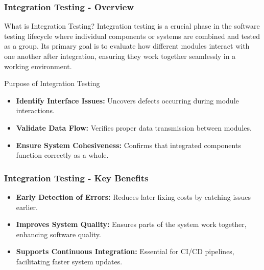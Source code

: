 \documentclass{beamer}
\begin{document}
\begin{frame}[fragile]
    \frametitle{Integration Testing - Overview}
    \begin{block}{What is Integration Testing?}
        Integration testing is a crucial phase in the software testing lifecycle where individual components or systems are combined and tested as a group. Its primary goal is to evaluate how different modules interact with one another after integration, ensuring they work together seamlessly in a working environment.
    \end{block}
    
    \begin{block}{Purpose of Integration Testing}
        \begin{itemize}
            \item \textbf{Identify Interface Issues:} Uncovers defects occurring during module interactions.
            \item \textbf{Validate Data Flow:} Verifies proper data transmission between modules.
            \item \textbf{Ensure System Cohesiveness:} Confirms that integrated components function correctly as a whole.
        \end{itemize}
    \end{block}
\end{frame}

\begin{frame}[fragile]
    \frametitle{Integration Testing - Key Benefits}
    \begin{itemize}
        \item \textbf{Early Detection of Errors:} Reduces later fixing costs by catching issues earlier.
        \item \textbf{Improves System Quality:} Ensures parts of the system work together, enhancing software quality.
        \item \textbf{Supports Continuous Integration:} Essential for CI/CD pipelines, facilitating faster system updates.
    \end{itemize}
\end{frame}
\end{document}
